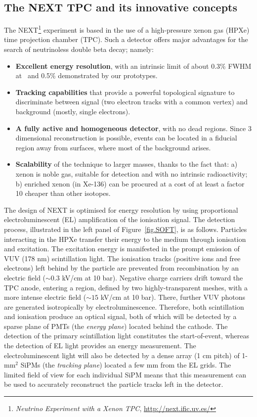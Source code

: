 \subsection*{The NEXT TPC and its innovative concepts}

The NEXT\footnote{\emph{Neutrino Experiment with a Xenon TPC}, \href{http://next.ific.uv.es/}{http://next.ific.uv.es/}} experiment is based in the use of a high-pressure xenon gas (HPXe) time projection chamber (TPC). Such a detector 
offers major advantages for the search of neutrinoless double beta decay; namely: 
\begin{itemize}
\item {\bf Excellent energy resolution}, with an intrinsic limit of about 0.3\% FWHM at \Qbb\ and 0.5\% demonstrated by our prototypes.
\item {\bf Tracking capabilities} that provide a powerful topological signature to discriminate between signal (two electron tracks with a common vertex) and background (mostly, single electrons).
\item {\bf A fully active and homogeneous detector}, with no dead regions. Since 3 dimensional reconstruction is possible, events can be located in a fiducial region away from surfaces, where most of the background arises.
\item  {\bf Scalability} of the technique to larger masses, thanks to the fact that: a) xenon is noble gas, suitable for detection and with no intrinsic radioactivity; b) enriched xenon (in Xe-136) can be procured at a cost of at least a factor 10 cheaper than other isotopes.
\end{itemize}

The design of NEXT is optimised for energy resolution by using proportional electroluminescent (EL) amplification of the ionisation signal. The detection process, illustrated in the left panel of Figure~\ref{fig.SOFT}, is as follows. Particles interacting in the HPXe transfer their energy to the medium through ionisation and excitation. The excitation energy is manifested in the prompt emission of VUV (178 nm) scintillation light. The ionisation tracks (positive ions and free electrons) left behind by the particle are prevented from recombination by an electric field ($\sim0.3$ kV/cm at 10 bar). Negative charge carriers drift toward the TPC anode, entering a region, defined by two highly-transparent meshes, with a more intense electric field ($\sim15$ kV/cm at 10 bar). There, further VUV photons are generated isotropically by electroluminescence. Therefore, both scintillation and ionisation produce an optical signal, both of which will be detected by a sparse plane of PMTs (the \emph{energy plane}) located behind the cathode. The detection of the primary scintillation light constitutes the start-of-event, whereas the detection of EL light provides an energy measurement. The electroluminescent light will also be detected by a dense array (1 cm pitch) of 1-mm$^{2}$ SiPMs (the \emph{tracking plane}) located a few mm from the EL grids. The limited field of view for each individual SiPM means that this measurement can be used to accurately reconstruct the particle tracks left in the detector.

